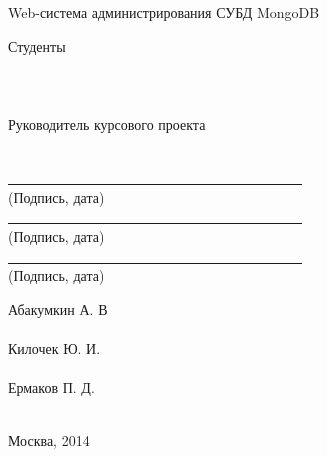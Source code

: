 \begin{titlepage}
\vfill

\begin{center}
  \LARGE Web-система администрирования СУБД MongoDB\\
\end{center}

\vfill

\begin{minipage}{0.3\textwidth}
  \begin{flushleft}
    Студенты\\
    ~\\
    ~\\
    ~\\
    Руководитель курсового проекта\\
    ~\\
  \end{flushleft}
\end{minipage}
\begin{minipage}{0.3\textwidth}
  \begin{center}
    \underline{~~~~~~~~~~~~~~~~~~~~~~~~~~~~~~~~~~~~~~~~~~}\\
    (Подпись, дата)\\
    \underline{~~~~~~~~~~~~~~~~~~~~~~~~~~~~~~~~~~~~~~~~~~}\\
    (Подпись, дата)\\
    \underline{~~~~~~~~~~~~~~~~~~~~~~~~~~~~~~~~~~~~~~~~~~}\\
    (Подпись, дата)\\
  \end{center}
\end{minipage}
\begin{minipage}{0.3\textwidth}
  \begin{center}
    Абакумкин А. В\\
    ~\\
    Килочек Ю. И.\\
    ~\\
    Ермаков П. Д.\\
    ~\\
  \end{center}
\end{minipage}

\vfill

\centering Москва, 2014

\end{titlepage}
